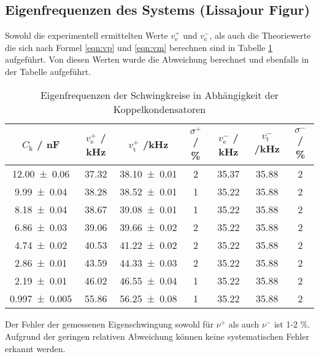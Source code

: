 \subsection{Eigenfrequenzen des Systems (Lissajour Figur)}
Sowohl die experimentell ermittelten Werte $v_\text{e}^+$ und  $v_\text{e}^-$, als auch die Theoriewerte die sich nach Formel \ref{eqn:vp} und \ref{eqn:vm} berechnen sind in Tabelle \ref{tab:eigen} aufgeführt. Von diesen Werten wurde die Abweichung berechnet und ebenfalls in der Tabelle aufgeführt.
\begin{table}
  \centering
  \begin{tabular}{c c c c c c c}
    \toprule
    $C_\text{k}$ / nF & $v_\text{e}^+$ / kHz & $v_\text{t}^+$ /kHz & $\sigma^+$ / \% & $v_\text{e}^-$ / kHz & $v_\text{t}^-$ /kHz & $\sigma^-$ / \%  \\
    \midrule
    \num{12.00 +- 0.06}	& 37.32	& \num{38.10 +- 0.01} & 2 & 35.37 & 35.88 & 2 \\
    \num{9.99 +- 0.04}	& 38.28	& \num{38.52 +- 0.01} & 1 & 35.22 & 35.88 & 2 \\
    \num{8.18 +- 0.04}	& 38.67 & \num{39.08 +- 0.01} & 1 & 35.22 & 35.88 & 2 \\
    \num{6.86 +- 0.03}	& 39.06 & \num{39.66 +- 0.02} & 2 & 35.22 & 35.88 & 2 \\
    \num{4.74 +- 0.02}	& 40.53 & \num{41.22 +- 0.02} & 2 & 35.22 & 35.88 & 2 \\
    \num{2.86 +- 0.01}	& 43.59 & \num{44.33 +- 0.03} & 2 & 35.22 & 35.88 & 2 \\
    \num{2.19 +- 0.01}	& 46.02 & \num{46.55 +- 0.04} & 1 & 35.22 & 35.88 & 2 \\
    \num{0.997 +- 0.005}	& 55.86 & \num{56.25 +- 0.08} & 1 & 35.22 & 35.88 & 2 \\
    \bottomrule
  \end{tabular}
  \caption{Eigenfrequenzen der Schwingkreise in Abhängigkeit der Koppelkondensatoren}
  \label{tab:eigen}
\end{table}
Der Fehler der gemessenen Eigenschwingung sowohl für $\nu^+$ als auch $\nu^-$ ist 1-2 \%. Aufgrund der geringen relativen Abweichung können keine systematischen Fehler erkannt werden.
